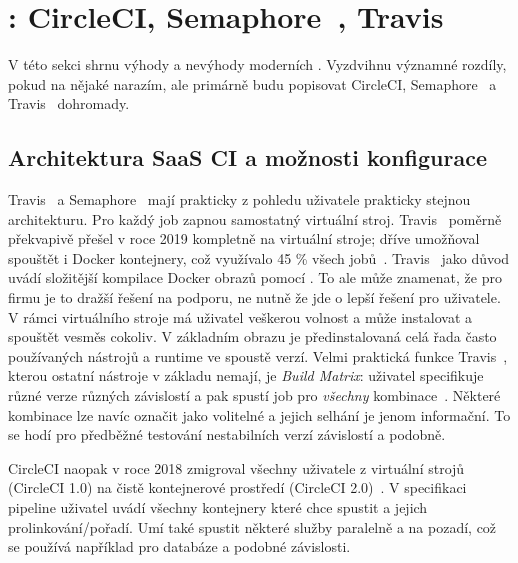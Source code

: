 \newcommand{\circleci}{\xspace{}CircleCI\xspace}
\newcommand{\travis}{\xspace{}Travis~\glstext{CI}\xspace}
\newcommand{\semaphore}{\xspace{}Semaphore~\xspace}

\section{: \circleci, \semaphore, \travis}
    V této sekci shrnu výhody a nevýhody moderních  \CI. Vyzdvihnu významné rozdíly, pokud na nějaké narazím, ale primárně budu popisovat \circleci, \semaphore a \travis dohromady.

    \subsection{Architektura SaaS CI a možnosti konfigurace}
        \travis a \semaphore mají prakticky z pohledu uživatele prakticky stejnou architekturu. Pro každý job zapnou samostatný virtuální stroj. \travis poměrně překvapivě přešel v roce 2019 kompletně na virtuální stroje; dříve umožňoval spouštět i Docker kontejnery, což využívalo 45 \% všech jobů~\cite{travis-arch}. \travis jako důvod uvádí složitější kompilace Docker obrazů pomocí . To ale může znamenat, že pro firmu je to dražší řešení na podporu, ne nutně že jde o lepší řešení pro uživatele. V rámci virtuálního stroje má uživatel veškerou volnost a může instalovat a spouštět vesměs cokoliv. V základním obrazu je předinstalovaná celá řada často používaných nástrojů a runtime ve spoustě verzí. Velmi praktická funkce \travis, kterou ostatní \CI nástroje v základu nemají, je \textit{Build Matrix}: uživatel specifikuje různé verze různých závislostí a \CI pak spustí job pro \textit{všechny} kombinace~\cite{travis-build-matrix}. Některé kombinace lze navíc označit jako volitelné a jejich selhání je jenom informační. To se hodí pro předběžné testování nestabilních  verzí závislostí a podobně.

        \circleci naopak v roce 2018 zmigroval všechny uživatele z virtuální strojů (\circleci 1.0) na čistě kontejnerové prostředí (\circleci 2.0)~\cite{circle-migration}. V specifikaci pipeline uživatel uvádí všechny kontejnery které chce spustit a jejich prolinkování/pořadí. Umí také spustit některé služby paralelně a na pozadí, což se používá například pro databáze a podobné závislosti.

